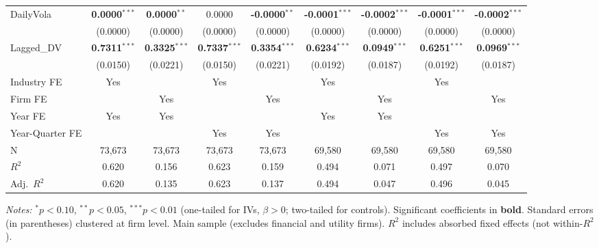 \begin{landscape}
\begin{table}[H]
\begin{tabular}{lcccccccc}
DailyVola & \textbf{0.0000}$^{***}$ & \textbf{0.0000}$^{**}$ & 0.0000 & \textbf{-0.0000}$^{**}$ & \textbf{-0.0001}$^{***}$ & \textbf{-0.0002}$^{***}$ & \textbf{-0.0001}$^{***}$ & \textbf{-0.0002}$^{***}$ \\
 & (0.0000) & (0.0000) & (0.0000) & (0.0000) & (0.0000) & (0.0000) & (0.0000) & (0.0000) \\
Lagged\_DV & \textbf{0.7311}$^{***}$ & \textbf{0.3325}$^{***}$ & \textbf{0.7337}$^{***}$ & \textbf{0.3354}$^{***}$ & \textbf{0.6234}$^{***}$ & \textbf{0.0949}$^{***}$ & \textbf{0.6251}$^{***}$ & \textbf{0.0969}$^{***}$ \\
 & (0.0150) & (0.0221) & (0.0150) & (0.0221) & (0.0192) & (0.0187) & (0.0192) & (0.0187) \\
\midrule
Industry FE & Yes &  & Yes &  & Yes &  & Yes &  \\
Firm FE &  & Yes &  & Yes &  & Yes &  & Yes \\
Year FE & Yes & Yes &  &  & Yes & Yes &  &  \\
Year-Quarter FE &  &  & Yes & Yes &  &  & Yes & Yes \\
\midrule
N & 73,673 & 73,673 & 73,673 & 73,673 & 69,580 & 69,580 & 69,580 & 69,580 \\
$R^2$ & 0.620 & 0.156 & 0.623 & 0.159 & 0.494 & 0.071 & 0.497 & 0.070 \\
Adj.~$R^2$ & 0.620 & 0.135 & 0.623 & 0.137 & 0.494 & 0.047 & 0.496 & 0.045 \\
\bottomrule
\end{tabular}
\begin{minipage}{\linewidth}
\vspace{2pt}\scriptsize
\textit{Notes:} $^{*}p<0.10$, $^{**}p<0.05$, $^{***}p<0.01$ (one-tailed for IVs, $\beta > 0$; two-tailed for controls).
 Significant coefficients in \textbf{bold}.
 Standard errors (in parentheses) clustered at firm level.
 Main sample (excludes financial and utility firms).
 $R^2$ includes absorbed fixed effects (not within-$R^2$).
\end{minipage}
\end{table}
\end{landscape}